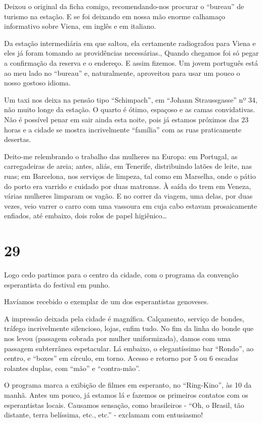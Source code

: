 Deixou o original da ficha comigo, recomendando-nos procurar o “bureau” de turismo na estação. E se foi deixando em nossa mão enorme calhamaço informativo sobre Viena, em inglês e em italiano.

Da estação intermediária em que saltou, ela certamente radiografou para Viena e eles já foram tomando as providências necessárias., Quando chegamos foi só pegar a confirmação da reserva e o endereço. E assim fizemos. Um jovem português está ao meu lado no “bureau” e, naturalmente, aproveitou para usar um pouco o nosso gostoso idioma.

Um taxi nos deixa na pensão tipo “Schimpach”, em “Johann Straussgasse” nº 34, não muito longe da estação. O quarto é ótimo, espaçoso e as camas convidativas. Não é possível penar em sair ainda esta noite, pois já estamos próximos das 23 horas e a cidade se mostra incrivelmente “família” com as ruas praticamente desertas.

Deito-me relembrando o trabalho das mulheres na Europa: em Portugal, as carregadeiras de areia; antes, aliás, em Tenerife, distribuindo latões de leite, nas ruas; em Barcelona, nos serviços de limpeza, tal como em Marselha, onde o pátio do porto era varrido e cuidado por duas matronas. À saída do trem em Veneza, várias mulheres limparam os vagão. E no correr da viagem, uma delas, por duas vezes, veio varrer o carro com uma vassoura em cuja cabo estavam prosaicamente enfiados, até embaixo, dois rolos de papel higiênico\ldots

\section*{29 \adfflatleafright {}}
Logo cedo partimos para o centro da cidade, com o programa da convenção esperantista do festival em punho.

Havíamos recebido o exemplar de um dos esperantistas genoveses.

A impressão deixada pela cidade é magnífica. Calçamento, serviço de bondes, tráfego incrivelmente silencioso, lojas, enfim tudo. No fim da linha do bonde que nos levou (passagem cobrada por mulher uniformizada), damos com uma passagem subterrânea espetacular. Lá embaixo, o elegantíssimo bar “Rondo”, ao centro, e “boxes” em círculo, em torno. Acesso e retorno por 5 ou 6 escadas rolantes duplas, com “mão” e “contra-mão”.

O programa marca a exibição de filmes em esperanto, no “Ring-Kino”, às 10 da manhã. Antes um pouco, já estamos lá e fazemos os primeiros contatos com os esperantistas locais. Causamos sensação, como brasileiros - “Oh, o Brasil, tão distante, terra belíssima, etc., etc.” - exclamam com entusiasmo!


